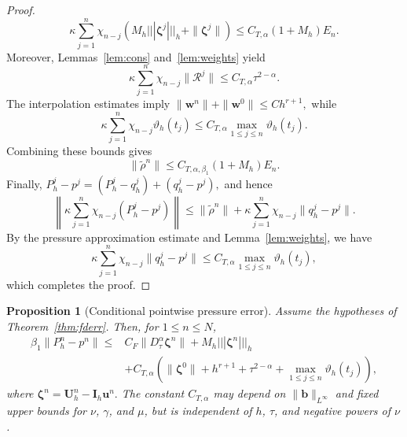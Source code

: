 \documentclass[11pt,a4paper]{article}
\numberwithin{equation}{section}
\theoremstyle{plain}
\newtheorem{proposition}[theorem]{Proposition}
\theoremstyle{definition}
\theoremstyle{remark}
\newcommand{\nrm}[1]{|||#1|||_h}      %
\newcommand{\Dt}{D_\tau^{\alpha}}     %
\begin{document}
\begin{proof}
\[\kappa\sum_{j=1}^n
\chi_{n-j}
\left(
M_h\nrm{\bm\zeta^j}
+\|\bm\zeta^j\|
\right)
\le C_{T,\alpha}(1+M_h)E_n.
\]
%
Moreover, Lemmas~\ref{lem:cons}
and~\ref{lem:weights} yield
\[
\kappa\sum_{j=1}^n
\chi_{n-j}\|\mathcal R^j\|
\le C_{T,\alpha}\tau^{2-\alpha}.
\]
The interpolation estimates imply
$
\|\bm w^n\|+\|\bm w^0\|
\le Ch^{r+1},
$
while
\[
\kappa\sum_{j=1}^n
\chi_{n-j}\vartheta_h(t_j)
\le C_{T,\alpha}
\max_{1\le j\le n}\vartheta_h(t_j).
\]
Combining these bounds gives
\[
\|\widetilde\rho^n\|
\le C_{T,\alpha,\beta_1}(1+M_h)E_n.
\]
%
Finally,
$
P_h^j-p^j
=(P_h^j-q_h^j)+(q_h^j-p^j),
$
and hence
\[
\left\|
\kappa\sum_{j=1}^n
\chi_{n-j}(P_h^j-p^j)
\right\|
\le
\|\widetilde\rho^n\|
+
\kappa\sum_{j=1}^n
\chi_{n-j}\|q_h^j-p^j\|.
\]
By the pressure approximation estimate
and Lemma~\ref{lem:weights}, we have
\[
\kappa\sum_{j=1}^n
\chi_{n-j}\|q_h^j-p^j\|
\le C_{T,\alpha}
\max_{1\le j\le n}\vartheta_h(t_j),
\]
which completes the proof.
\end{proof}







\begin{proposition}[Conditional pointwise pressure error]
\label{prop:pointwise-pressure}
Assume the hypotheses of Theorem~\ref{thm:fderr}.
Then, for $1\le n\le N$,
\[
\begin{aligned}
\beta_1\|P_h^n-p^n\|
\le {}&
C_F\|\Dt\bm\zeta^n\|
+M_h\nrm{\bm\zeta^n}
\\
&+C_{T,\alpha}
\left(
\|\bm\zeta^0\|
+h^{r+1}
+\tau^{2-\alpha}
+\max_{1\le j\le n}\vartheta_h(t_j)
\right),
\end{aligned}
\]
where
$
\bm\zeta^n=\bm U_h^n-\bm I_h\bm u^n.
$
The constant $C_{T,\alpha}$ may depend on
$\|\bm b\|_{L^\infty}$ and fixed upper bounds
for $\nu$, $\gamma$, and $\mu$, but is independent
of $h$, $\tau$, and negative powers of $\nu$.
\end{proposition}

\end{document}
